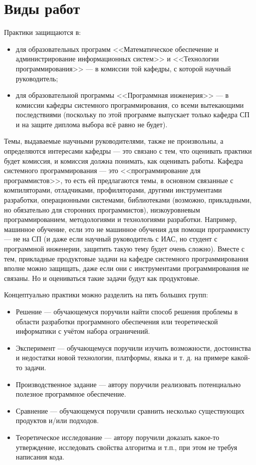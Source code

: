 \documentclass{article}
\begin{document}
\section{Виды работ}

Практики защищаются в: 
\begin{itemize}
    \item для образовательных программ <<Математическое обеспечение и администрирование информационных систем>> и <<Технологии программирования>> --- в комиссии той кафедры, с которой научный руководитель;
    \item для образовательной программы <<Программная инженерия>> --- в комиссии кафедры системного программирования, со всеми вытекающими последствиями (поскольку по этой программе выпускает только кафедра СП и на защите диплома выбора всё равно не будет).
\end{itemize}

Темы, выдаваемые научными руководителями, также не произвольны, а определяются интересами кафедры --- это связано с тем, что оценивать практики будет комиссия, и комиссия должна понимать, как оценивать работы. Кафедра системного программирования --- это <<программирование для программистов>>, то есть ей предлагаются темы, в основном связанные с компиляторами, отладчиками, профиляторами, другими инструментами разработки, операционными системами, библиотеками (возможно, прикладными, но обязательно для сторонних программистов), низкоуровневым программированием, методологиями и технологиями разработки. Например, машинное обучение, если это не машинное обучения для помощи программисту --- не на СП (и даже если научный руководитель с ИАС, но студент с программной инженерии, защитить такую тему будет очень сложно). Вместе с тем, прикладные продуктовые задачи на кафедре системного программирования вполне можно защищать, даже если они с инструментами программирования не связаны. Но и оцениваться такие задачи будут как продуктовые.

Концептуально практики можно разделить на пять больших групп:

\begin{itemize}
    \item Решение --- обучающемуся поручили найти способ решения проблемы в области разработки программного обеспечения или теоретической информатики с учётом набора ограничений.
    \item Эксперимент --- обучающемуся поручили изучить возможности, достоинства и недостатки новой технологии, платформы, языка и т. д. на примере какой-то задачи.
    \item Производственное задание --- автору поручили реализовать потенциально полезное программное обеспечение.
    \item Сравнение --- обучающемуся поручили сравнить несколько существующих продуктов и/или подходов.
    \item Теоретическое исследование --- автору поручили доказать какое-то утверждение, исследовать свойства алгоритма и т.п., при этом не требуя написания кода.
\end{itemize}
\end{document}
